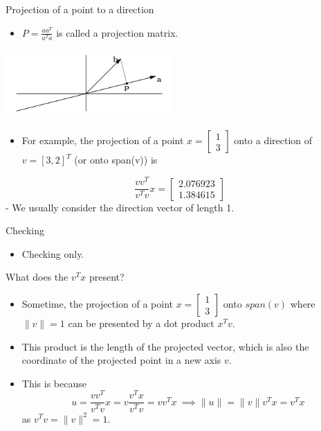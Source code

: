 \documentclass[
  ignorenonframetext,
]{beamer}
\providecommand{\tightlist}{%
  \setlength{\itemsep}{0pt}\setlength{\parskip}{0pt}}\usepackage{longtable,booktabs,array}
\begin{document}
\begin{frame}{Projection of a point to a direction}
\protect\hypertarget{projection-of-a-point-to-a-direction-1}{}
\begin{itemize}
\tightlist
\item
  \(P=\frac{aa^T}{a^Ta}\) is called a projection matrix.
\end{itemize}

\includegraphics[width=2.51042in,height=\textheight]{images/pca1.png}

\begin{itemize}
\tightlist
\item
  For example, the projection of a point
  \(x = \begin{bmatrix} 1 \\ 3 \end{bmatrix}\) onto a direction of
  \(v = [3, 2]^T\) (or onto span(v)) is
\end{itemize}

\[
\frac{vv^T}{v^Tv}x = \begin{bmatrix}
   2.076923  \\ 1.384615
  \end{bmatrix}
\] - We usually consider the direction vector of length 1.
\end{frame}

\begin{frame}{Checking}
\protect\hypertarget{checking}{}
\begin{itemize}
\tightlist
\item
  Checking only.
\end{itemize}
\end{frame}

\begin{frame}{What does the \(v^Tx\) present?}
\protect\hypertarget{what-does-the-vtx-present}{}
\begin{itemize}
\item
  Sometime, the projection of a point
  \(x = \begin{bmatrix} 1 \\ 3 \end{bmatrix}\) onto \(span(v)\) where
  \(\|v\| = 1\) can be presented by a dot product \(x^Tv\).
\item
  This product is the length of the projected vector, which is also the
  coordinate of the projected point in a new axis \(v\).
\item
  This is because \[
  u = \frac{vv^T}{v^Tv}x = v\frac{v^Tx}{v^Tv} = vv^Tx \
  \implies \|u\| = \|v\|v^Tx = v^Tx
  \] as \(v^Tv = \|v\|^2=1\).
\end{itemize}
\end{frame}
\end{document}
